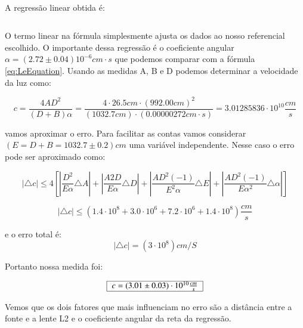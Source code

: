 \documentclass[a4paper,11pt]{article}
\newcommand{\MyBox}[1]
{
	\begin{tabular}{|l|}\hline
	  #1 \\ \hline	    
	\end{tabular} 	
}
\begin{document}
\paragraph{} A regressão linear obtida é:

\begin{equation}
	
\end{equation}

O termo linear na fórmula simplesmente ajusta os dados ao nosso referencial escolhido.
O importante dessa regressão é o coeficiente angular $\alpha = (2.72 \pm 0.04)10^{-6} cm \cdot s$ que podemos comparar com a fórmula \ref{eq:LeEquation}. Usando as medidas A, B e D podemos determinar a velocidade da luz como:

\begin{equation}
	c = \frac{4AD^2 }{(D+B)\alpha} = \frac{4\cdot26.5cm\cdot(992.00 cm)^2}{(1032.7 cm)
	\cdot (0.00000272 cm \cdot s)} = 3.01285836 \cdot 10^{10} \frac{cm}{s}
\end{equation}

vamos aproximar o erro. Para facilitar as contas vamos considerar $(E = D + B = 1032.7 \pm 0.2)cm$ uma variável independente. Nesse caso o erro pode ser aproximado como:

\begin{equation}
	|\triangle c| \leq 4\left[ |\frac{D^2}{E \alpha}\triangle A|
	+|\frac{A2D}{E \alpha}\triangle D| +
	|\frac{AD^2 (-1)}{E^2 \alpha}\triangle E |+
	|\frac{AD^2 (-1)}{E \alpha^2}\triangle \alpha |\right] 
\end{equation}

\begin{equation}
	|\triangle c| \leq (1.4 \cdot 10^{8}
	+ 3.0 \cdot 10^{6}
	+ 7.2 \cdot 10^{6}
	+ 1.4 \cdot 10^{8}) \frac{cm}{s}
\end{equation}

e o erro total é:
\begin{equation}
	|\triangle c| = (3 \cdot 10^{8})cm/S
\end{equation}

Portanto nossa medida foi:

\begin{equation}
\MyBox{$	c = (3.01 \pm 0.03) \cdot 10^{10} \frac{cm}{s}$}
\end{equation}



Vemos que os dois fatores que mais influenciam no erro são a distância entre a fonte 
e a lente L2 e o coeficiente angular da reta da regressão. 
\end{document}
